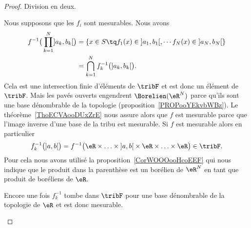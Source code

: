 \begin{proof}
	Division en deux.
	\begin{subproof}
		Nous supposons que les \( f_i\) sont mesurables. Nous avons
		\begin{subequations}
			\begin{align}
				f^{-1}\big( \prod_{k=1}^N\mathopen] a_k , b_k \mathclose[ \big) & =\{ x\in S\tq f_1(x)\in\mathopen] a_1 , b_1 \mathclose[ ,\cdots f_N(x)\in\mathopen] a_N , b_N \mathclose[\} \\
				                                                                & =\bigcap_{k=1}^Nf_k^{-1}\big( \mathopen] a_k , b_k \mathclose[ \big).
			\end{align}
		\end{subequations}
		Cela est une intersection finie d'éléments de \( \tribF\) et est donc un élément de \( \tribF\). Mais les pavés ouverts engendrent \( \Borelien(\eR^N)\) parce qu'ils sont une base dénombrable de la topologie (proposition~\ref{PROPooYEkvbWBz}). Le théorème~\ref{ThoECVAooDUxZrE} nous assure alors que \( f\) est mesurable parce que l'image inverse d'une base de la tribu est mesurable.
		Si \( f\) est mesurable alors en particulier
		\begin{equation}
			f_k^{-1}\big( \mathopen] a , b \mathclose[ \big)=f^{-1}\big( \eR\times\ldots\times \mathopen] a , b \mathclose[\times \eR\times\ldots\times \eR \big)\in\tribF.
		\end{equation}
		Pour cela nous avons utilisé la proposition~\ref{CorWOOOooHcoEEF} qui nous indique que le produit dans la parenthèse est un borélien de \( \eR^N\) en tant que produit de boréliens de \( \eR\).

		Encore une fois \( f_k^{-1}\) tombe dans \( \tribF\) pour une base dénombrable de la topologie de \( \eR\) et est donc mesurable.
	\end{subproof}
\end{proof}

